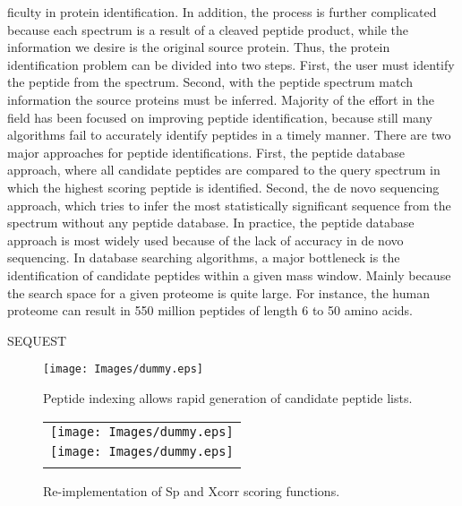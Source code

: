 \documentclass{bioinfo}
\begin{document}
ficulty in protein identification. In addition, the process is further complicated because each spectrum is a result of a cleaved peptide product, while the information we desire is the original source protein. Thus, the protein identification problem can be divided into two steps. First, the user must identify the peptide from the spectrum. Second, with the peptide spectrum match information the source proteins must be inferred. Majority of the effort in the field has been focused on improving peptide identification, because still many algorithms fail to accurately identify peptides in a timely manner.
	There are two major approaches for peptide identifications. First, the peptide database approach, where all candidate peptides are compared to the query spectrum in which the highest scoring peptide is identified. Second, the de novo sequencing approach, which tries to infer the most statistically significant sequence from the spectrum without any peptide database. In practice, the peptide database approach is most widely used because of the lack of accuracy in de novo sequencing. In database searching algorithms, a major bottleneck is the identification of candidate peptides within a given mass window. Mainly because the search space for a given proteome is quite large. For instance, the human proteome can result in 550 million peptides of length 6 to 50 amino acids.

SEQUEST\citep{eng:approach}


\begin{figure}
  \centering
  \texttt{[image: Images/dummy.eps]}
  \caption{Peptide indexing allows rapid generation of candidate peptide
  lists.}
  \label{figure:indexing}
\end{figure}

\begin{figure}
  \centering
  \begin{tabular}{c}
  \texttt{[image: Images/dummy.eps]} \\
  \texttt{[image: Images/dummy.eps]} \\
  \caption{Re-implementation of Sp and Xcorr scoring functions.}
  \label{figure:indexing}
  \end{tabular}
\end{figure}
\end{document}
